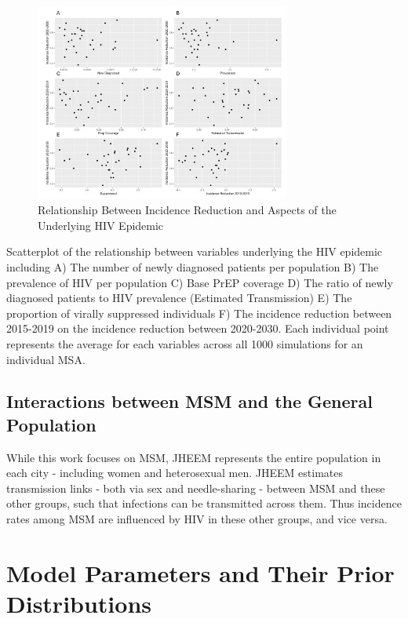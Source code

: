 \documentclass{article}
\begin{document}
\begin{figure}[H]
	\centering
	\caption{Relationship Between Incidence Reduction and Aspects of the Underlying HIV Epidemic}
	\includegraphics[width=0.75\textwidth]{images/FigureS7}
\end{figure}

Scatterplot of the relationship between variables underlying the HIV epidemic including A)  The number of newly diagnosed patients per population B) The prevalence of HIV per population C) Base PrEP coverage D) The ratio of newly diagnosed patients to HIV prevalence (Estimated Transmission) E) The proportion of virally suppressed individuals F) The incidence reduction between 2015-2019 on the incidence reduction between 2020-2030. Each individual point represents the average for each variables across all 1000 simulations for an individual MSA. 


\subsection{Interactions between MSM and the General Population}
While this work focuses on MSM, JHEEM represents the entire population in each city - including women and heterosexual men. JHEEM estimates transmission links - both via sex and needle-sharing - between MSM and these other groups, such that infections can be transmitted across them. Thus incidence rates among MSM are influenced by HIV in these other groups, and vice versa.


\newpage
\section{Model Parameters and Their Prior Distributions}
\tabulinesep=2pt
\end{document}
